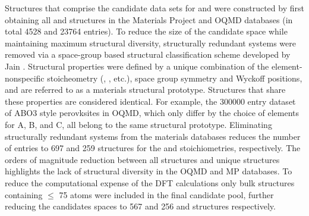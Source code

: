 %
%
Structures that comprise the candidate data sets for \IrOtwo and \IrOthree were constructed by first obtaining all \ABtwo and \ABthree structures in the Materials Project\cite{Jain2013} and OQMD\cite{Kirklin2015} databases
(in total \num{4528} \ABtwo and \num{23764} \ABthree entries).
%
To reduce the size of the candidate space while maintaining maximum structural diversity, structurally redundant systems were removed via a space-group based structural classification scheme developed by Jain  \cite{Jain2018}.
Structural properties were defined by a unique combination of the element-nonspecific stoicheometry (\ABtwo, \ABthree, etc.), space group symmetry and Wyckoff positions, and are referred to as a materials structural prototype.
%
Structures that share these properties are considered identical.
%
For example, the \num{300000} entry dataset of ABO3 style perovksites in OQMD, which only differ by the choice of elements for A, B, and C, all belong to the same structural prototype.
%
Eliminating structurally redundant systems from the materials databases reduces the number of entries to \num{697} and \num{259} structures for the \ABtwo and \ABthree stoichiometries, respectively.
%
The orders of magnitude reduction between all structures and unique structures highlights the lack of structural diversity in the OQMD and MP databases.
%
To reduce the computational expense of the DFT calculations only bulk structures containing $\leq$ \num{75} atoms were included in the final candidate pool, further reducing the candidates spaces to \num{567} and \num{256} \ABtwo and \ABthree structures respectively.
%

